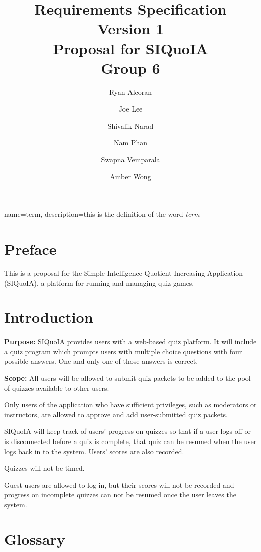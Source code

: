 \documentclass[12pt]{article}
\begin{document}
\title{Requirements Specification \\ {\large Version 1} \\[1em] {\large
    Proposal for SIQuoIA} \\[1em] Group 6}

\author{ Ryan Alcoran \and Joe Lee \and Shivalik Narad \and Nam Phan
  \and Swapna Vemparala \and Amber Wong }

\maketitle

{
  name=term,
  description={this is the definition of the word {\it term}}
}


\section{Preface}
This is a proposal for the Simple Intelligence Quotient Increasing
Application (SIQuoIA), a platform for running and managing quiz games.

\section{Introduction}
{\bf Purpose:} SIQuoIA provides users with a web-based quiz
platform. It will include a quiz program which prompts users with
multiple choice questions with four possible answers. One and only one
of those answers is correct.

{\bf Scope:} All users will be allowed to submit quiz packets to be
added to the pool of quizzes available to other users.

Only users of the application who have sufficient privileges, such as
moderators or instructors, are allowed to approve and add
user-submitted quiz packets.

SIQuoIA will keep track of users' progress on quizzes so that if a
user logs off or is disconnected before a quiz is complete, that quiz
can be resumed when the user logs back in to the system. Users' scores
are also recorded.

Quizzes will not be timed.

Guest users are allowed to log in, but their scores will not be
recorded and progress on incomplete quizzes can not be resumed once
the user leaves the system.

\section{Glossary}
\printglossaries
\end{document}
